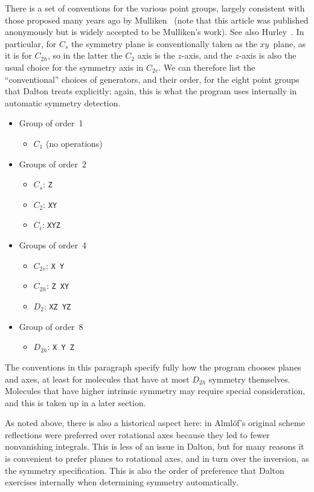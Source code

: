 There is a set of conventions for the various point groups,
largely consistent with those proposed many years ago by
Mulliken~\cite{unk55} (note that this article was published
anonymously but is widely accepted to be Mulliken's work).  See also
Hurley~\cite{Hur76}.  In
particular, for $C_s$ the symmetry plane is conventionally taken as
the $xy$~plane, as it is for $C_{2h}$, so in the latter the $C_2$ axis
is the $z$-axis, and the $z$-axis is also the usual choice for the
symmetry axis in
$C_{2v}$.  We can therefore list the ``conventional'' choices of
generators, and their order, for the eight point groups that Dalton
treats explicitly: again, this is what the program uses internally in
automatic symmetry detection.
\begin{itemize}
  \item Group of order~1
  \begin{itemize}
    \item $C_1$ (no operations)
  \end{itemize}
  \item Groups of order~2
  \begin{itemize}
    \item $C_s$: \verb|Z|
    \item $C_2$: \verb|XY|
    \item $C_i$: \verb|XYZ|
  \end{itemize}
  \item Groups of order~4
    \begin{itemize}
    \item $C_{2v}$: \verb|X Y|
    \item $C_{2h}$: \verb|Z XY|
    \item $D_2$: \verb|XZ YZ|
    \end{itemize}
  \item Group of order~8
    \begin{itemize}
    \item $D_{2h}$: \verb|X Y Z|
    \end{itemize}
\end{itemize}
The conventions in this paragraph specify fully how the
program chooses planes and axes, at least for molecules that have at
most $D_{2h}$ symmetry themselves.  Molecules that have higher
intrinsic symmetry may require special consideration, and this is
taken up in a later section.

As noted above, there is also a historical aspect here: in
Alml{\"o}f's original scheme~\cite{Alm72} reflections were preferred
over rotational axes because they led to fewer nonvanishing
integrals.  This is less of an issue in Dalton, but for many reasons
it is convenient to prefer planes to rotational axes, and in turn over
the inversion, as the symmetry specification.  This is also
the order of preference that Dalton exercises internally when
determining symmetry automatically.

